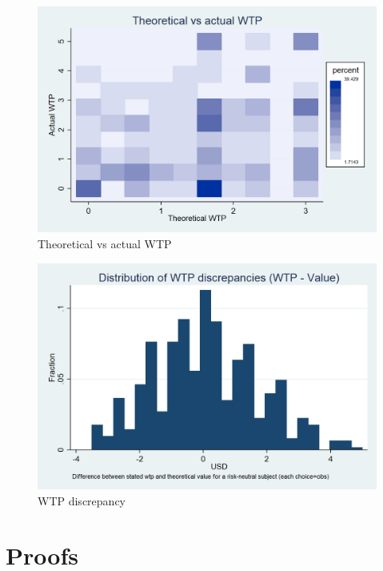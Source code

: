 \documentclass[12pt,a4paper]{article}
\begin{document}
\begin{figure}[H]
\centering
\caption{Theoretical vs actual WTP}\label{wtp_heat_fig}
\includegraphics[scale=0.3]{Graphs/WTP_value_heat.png}
\end{figure}

\begin{figure}[H]
\centering
\caption{WTP discrepancy} \label{WTP_discrepancy_fig}

  \centering
  \includegraphics[scale=0.3]{Graphs/hist_WTP_discr1.png}

\end{figure}



\newpage
\section{Proofs}
\end{document}
